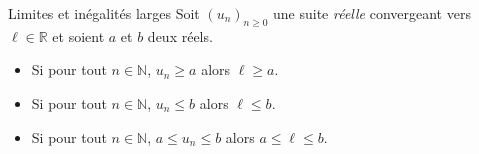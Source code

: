 \documentclass[french,11pt,twoside]{VcCours}
\begin{document}
%
%
%
%
%
%
%
% 
%
%
%
%



\begin{Proposition}{Limites et inégalités larges}
Soit $(u_n)_{n \geq 0}$ une suite \emph{réelle} convergeant vers $\ell \in \mathbb{R}$ et soient $a$ et $b$ deux réels.
\begin{itemize}
\item Si pour tout $n \in \mathbb{N}$, $u_n \geq a$ alors $\ell \geq a$.
\item Si pour tout $n \in \mathbb{N}$, $u_n \leq b$ alors $\ell \leq b$.
\item Si pour tout $n \in \mathbb{N}$, $a \leq u_n \leq b$ alors $a \leq \ell \leq b$.
\end{itemize}
\end{Proposition}
\end{document}
